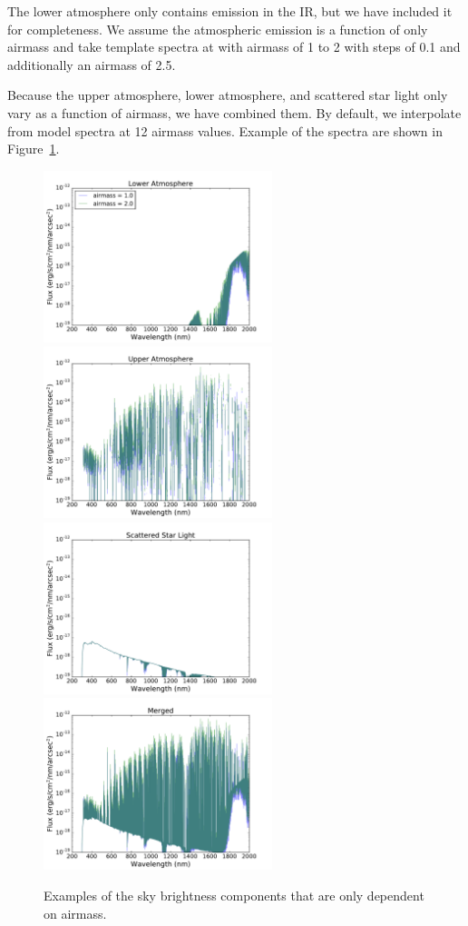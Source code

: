 \documentclass[]{spie}
\begin{document}
The lower atmosphere only contains emission in the IR, but we have included it for completeness.  We assume the atmospheric emission is a function of only airmass and take template spectra at with airmass of 1 to 2 with steps of 0.1 and additionally an airmass of 2.5.

Because the upper atmosphere, lower atmosphere, and scattered star light only vary as a function of airmass, we have combined them. By default, we interpolate from model spectra at 12 airmass values.  Example of the spectra are shown in Figure~\ref{fig:merged}.


\begin{figure}
  \includegraphics[height=5cm]{plots/merged0.pdf}\includegraphics[height=5cm]{plots/merged1.pdf} \\
  \includegraphics[height=5cm]{plots/merged2.pdf}\includegraphics[height=5cm]{plots/merged3.pdf}
  \caption{Examples of the sky brightness components that are only dependent on airmass. \label{fig:merged}}
\end{figure}
\end{document}
